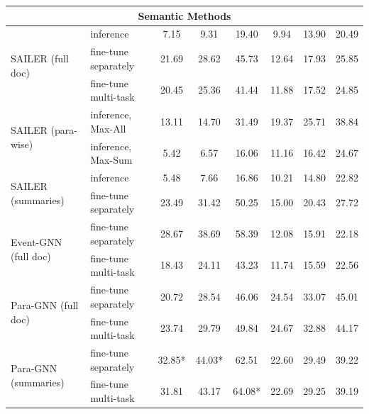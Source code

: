 \begin{table}[!thb]
\begin{tabular}{p{}p{}cccccc}
         \multicolumn{8}{c}{\textbf{Semantic Methods}}\\ \midrule 

         
         \multirow{3}{0.24\textwidth}{SAILER (full doc)} & inference  & 7.15& 9.31& 19.40& 9.94& 13.90&20.49\\
         & fine-tune separately  & 21.69 & 28.62& 45.73&  12.64& 17.93&  25.85\\ 
         & fine-tune multi-task & 20.45& 25.36& 41.44& 11.88& 17.52& 24.85\\ \midrule 
         
         \multirow{2}{0.24\textwidth}{SAILER (para-wise)} & inference, Max-All & 13.11 & 14.70 & 31.49 & 19.37 & 25.71 & 38.84  \\
        & inference, Max-Sum & 5.42 & 6.57 & 16.06 & 11.16 & 16.42 & 24.67 \\ \midrule 
        \multirow{2}{0.24\textwidth}{SAILER (summaries)} & inference & 5.48& 7.66& 16.86& 10.21& 14.80& 22.82\\
        & fine-tune separately & 23.49& 31.42& 50.25& 15.00& 20.43& 27.72\\ \midrule 
        
         \multirow{2}{0.24\textwidth}{Event-GNN (full doc)} & fine-tune separately & 28.67 & 38.69 & 58.39&  12.08& 15.91&  22.18\\ 
         & fine-tune multi-task & 18.43& 24.11& 43.23& 11.74& 15.59& 22.56\\ \midrule 
         \multirow{2}{0.24\textwidth}{Para-GNN (full doc)} & fine-tune separately & 20.72& 28.54& 46.06&  24.54  & 33.07& 45.01\\ 
         & fine-tune multi-task & 23.74& 29.79& 49.84&  24.67& 32.88& 44.17\\ \midrule 
         
        
         \multirow{2}{0.24\textwidth}{Para-GNN (summaries)} & fine-tune separately & 32.85* & 44.03* & 62.51&   22.60& 29.49& 39.22\\ 
         & fine-tune multi-task & 31.81& 43.17& 64.08* & 22.69& 29.25& 39.19\\ \midrule 
         

\end{tabular}
\end{table}
